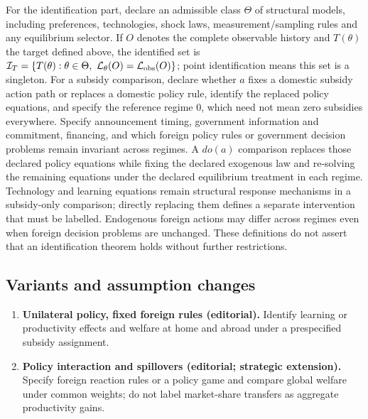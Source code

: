 \documentclass[11pt,a4paper]{article}
\begin{document}
For the identification part, declare an admissible class \(\Theta\) of structural models, including preferences, technologies, shock laws, measurement/sampling rules and any equilibrium selector. If \(O\) denotes the complete observable history and \(T(\theta)\) the target defined above, the identified set is \(\mathcal I_T=\{T(\theta):\theta\in\Theta,\ \mathcal L_\theta(O)=\mathcal L_{\rm obs}(O)\}\); point identification means this set is a singleton. For a subsidy comparison, declare whether \(a\) fixes a domestic subsidy action path or replaces a domestic policy rule, identify the replaced policy equations, and specify the reference regime \(0\), which need not mean zero subsidies everywhere. Specify announcement timing, government information and commitment, financing, and which foreign policy rules or government decision problems remain invariant across regimes. A \(do(a)\) comparison replaces those declared policy equations while fixing the declared exogenous law and re-solving the remaining equations under the declared equilibrium treatment in each regime. Technology and learning equations remain structural response mechanisms in a subsidy-only comparison; directly replacing them defines a separate intervention that must be labelled. Endogenous foreign actions may differ across regimes even when foreign decision problems are unchanged. These definitions do not assert that an identification theorem holds without further restrictions.
\subsection*{Variants and assumption changes}
\begin{enumerate}
\item \textbf{Unilateral policy, fixed foreign rules (editorial).} Identify learning or productivity effects and welfare at home and abroad under a prespecified subsidy assignment.
\item \textbf{Policy interaction and spillovers (editorial; strategic extension).} Specify foreign reaction rules or a policy game and compare global welfare under common weights; do not label market-share transfers as aggregate productivity gains.
\end{enumerate}
\end{document}

